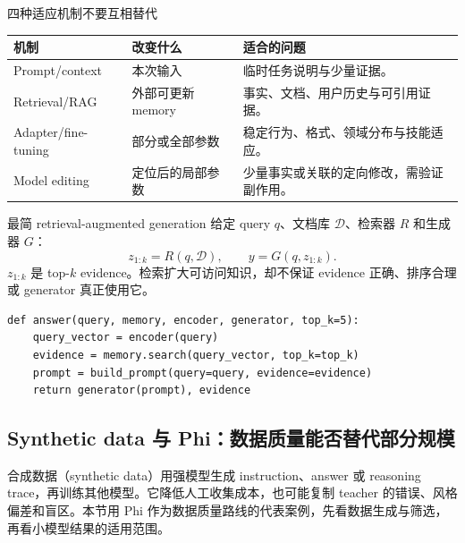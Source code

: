 

\begin{importantbox}{四种适应机制不要互相替代}
\begin{tabularx}{\textwidth}{L{0.19\textwidth} L{0.24\textwidth} X}
\toprule
机制 & 改变什么 & 适合的问题 \\
\midrule
Prompt/context & 本次输入 & 临时任务说明与少量证据。 \\
Retrieval/RAG & 外部可更新 memory & 事实、文档、用户历史与可引用证据。 \\
Adapter/fine-tuning & 部分或全部参数 & 稳定行为、格式、领域分布与技能适应。 \\
Model editing & 定位后的局部参数 & 少量事实或关联的定向修改，需验证副作用。 \\
\bottomrule
\end{tabularx}
\end{importantbox}

\begin{importantbox}{最简 retrieval-augmented generation}
给定 query $q$、文档库 $\mathcal{D}$、检索器 $R$ 和生成器 $G$：
\[
z_{1:k}=R(q,\mathcal{D}),\qquad y=G(q,z_{1:k}).
\]
$z_{1:k}$ 是 top-$k$ evidence。检索扩大可访问知识，却不保证 evidence 正确、排序合理或 generator 真正使用它。
\end{importantbox}

\begin{lstlisting}[caption={外部记忆检索与生成的最小流程}]
def answer(query, memory, encoder, generator, top_k=5):
    query_vector = encoder(query)
    evidence = memory.search(query_vector, top_k=top_k)
    prompt = build_prompt(query=query, evidence=evidence)
    return generator(prompt), evidence
\end{lstlisting}


\subsection{Synthetic data 与 Phi：数据质量能否替代部分规模}

合成数据（synthetic data）用强模型生成 instruction、answer 或 reasoning trace，再训练其他模型。它降低人工收集成本，也可能复制 teacher 的错误、风格偏差和盲区。本节用 Phi 作为数据质量路线的代表案例，先看数据生成与筛选，再看小模型结果的适用范围。

